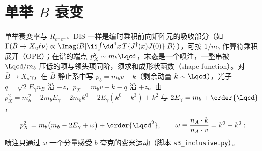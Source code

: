 \section{单举 $B$ 衰变}\label{sec:heavy-inclusive}

单举衰变率与 $R_{e^+e^-}$、DIS 一样是编时乘积前向矩阵元的吸收部分（如 $\Gamma(\bar B\to X_u\ell\bar\nu)\propto\Imag\langle\bar B|\ii\!\int\!\dd^4x\,T\{J^\dagger(x)J(0)\}|\bar B\rangle$），可按 $1/m_b$ 作算符乘积展开（OPE）；在谱的端点 $p_X^2\sim m_b\Lqcd$，末态是一个喷注，一整串被 $\Lqcd/m_b$ 压低的项与领头项同阶，须求和成形状函数（shape function）。对 $\bar B\to X_s\gamma$，在 $\bar B$ 静止系中写 $p_b=m_bv+k$（剩余动量 $k\sim\Lqcd$），光子 $q=\sqrt2E_\gamma n_B$ 沿 $-z$，$p_X=m_bv+k-q$ 沿 $+z$。由 $p_X^2=m_b^2-2m_bE_\gamma+2m_bk^0-2E_\gamma(k^0+k^3)+k^2$ 与 $2E_\gamma=m_b+\order{\Lqcd}$，
\begin{equation}\label{eq:heavy-pX2}
p_X^2=m_b\big(m_b-2E_\gamma+\omega\big)+\order{\Lqcd^2},\qquad \omega\equiv\frac{n_A\cdot k}{n_A\cdot v}=k^0-k^3 :
\end{equation}
喷注只通过 $\omega$ 一个分量感受 $b$ 夸克的费米运动（脚本 \texttt{s3\_\allowbreak inclusive.py}）。

